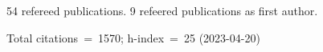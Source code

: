54 refereed publications. 9 refeered publications as first author.

Total citations~=~1570; h-index~=~25 (2023-04-20)